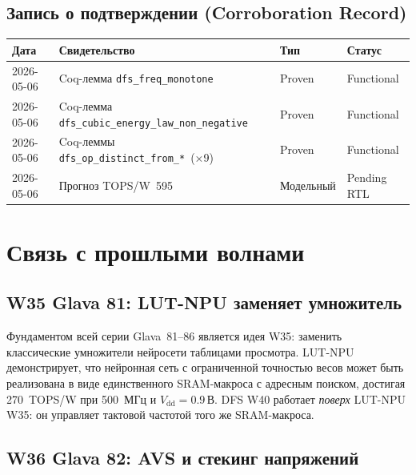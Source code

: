 \subsection{Запись о подтверждении (Corroboration Record)}
\label{subsec:falsif-corroboration}

\begin{center}
\begin{tabular}{llll}
\hline
Дата & Свидетельство & Тип & Статус \\
\hline
2026-05-06 & Coq-лемма \texttt{dfs\_freq\_monotone} & Proven & Functional \\
2026-05-06 & Coq-лемма \texttt{dfs\_cubic\_energy\_law\_non\_negative} & Proven & Functional \\
2026-05-06 & Coq-леммы \texttt{dfs\_op\_distinct\_from\_*}~(×9) & Proven & Functional \\
2026-05-06 & Прогноз TOPS/W~595 & Модельный & Pending RTL \\
\hline
\end{tabular}
\end{center}

\section{Связь с прошлыми волнами}
\label{sec:glava86-past-waves}

\subsection{W35 Glava 81: LUT-NPU заменяет умножитель}
\label{subsec:glava81}

Фундаментом всей серии Glava~81--86 является идея W35: заменить
классические умножители нейросети таблицами просмотра.
LUT-NPU~\cite{trios884} демонстрирует, что нейронная сеть с ограниченной
точностью весов может быть реализована в виде единственного SRAM-макроса
с адресным поиском, достигая 270~TOPS/W при 500~МГц и $V_{\mathrm{dd}} = 0{.}9\,\text{В}$.
DFS W40 работает \emph{поверх} LUT-NPU W35: он управляет тактовой
частотой того же SRAM-макроса.

\subsection{W36 Glava 82: AVS и стекинг напряжений}
\label{subsec:glava82}

